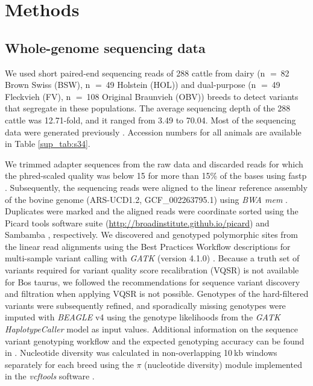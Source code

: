 \documentclass[../main.tex]{subfiles}
\begin{document}
\section{Methods}

\subsection*{Whole-genome sequencing data}

We used short paired-end sequencing reads of 288 cattle from dairy (n $=$ 82 Brown Swiss (BSW), n $=$ 49 Holstein (HOL)) and dual-purpose (n $=$ 49 Fleckvieh (FV), n $=$ 108 Original Braunvieh (OBV)) breeds to detect variants that segregate in these populations. The average sequencing depth of the 288 cattle was 12.71-fold, and it ranged from 3.49 to 70.04. Most of the sequencing data were generated previously \citep{daetwyler2014whole,crysnanto2019accurate,jansen2013assessment,baes2014evaluation,hofstetter2019non}. Accession numbers for all animals are available in Table \ref{sup_tab:s34}.

We trimmed adapter sequences from the raw data and discarded reads for which the phred-scaled quality was below 15 for more than 15\% of the bases using fastp \citep{chen2018fastp}. Subsequently, the sequencing reads were aligned to the linear reference assembly of the bovine genome (ARS-UCD1.2, GCF\_002263795.1) using \emph{BWA mem} \citep{li2013aligning}. 
Duplicates were marked and the aligned reads were coordinate sorted using the Picard tools software suite (\url{http://broadinstitute.github.io/picard}) and Sambamba \citep{tarasov2015sambamba}, respectively. We discovered and genotyped polymorphic sites from the linear read alignments using the Best Practices Workflow descriptions for multi-sample variant calling with \emph{GATK} (version 4.1.0) \citep{depristo2011framework}. Because a truth set of variants required for variant quality score recalibration (VQSR) is not available for Bos taurus, we followed the recommendations for sequence variant discovery and filtration when applying VQSR is not possible. Genotypes of the hard-filtered variants were subsequently refined, and sporadically missing genotypes were imputed with \emph{BEAGLE} v4 \citep{browning2016genotype} using the genotype likelihoods from the \emph{GATK HaplotypeCaller} model as input values. Additional information on the sequence variant genotyping workflow and the expected genotyping accuracy can be found in \citet{crysnanto2019accurate}. Nucleotide diversity was calculated in non-overlapping 10 kb windows separately for each breed using the $\pi$ (nucleotide diversity) module implemented in the \emph{vcftools} software \citep{danecek2011variant}.
\end{document}
